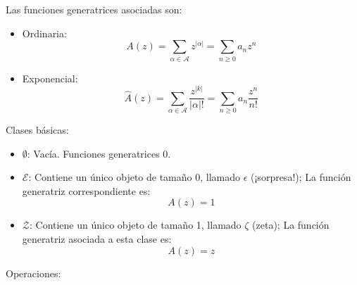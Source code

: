 \documentclass[english, spanish, fleqn, 10pt]{article}
\numberwithin{equation}{section}
\newcommand{\nparentesis}[1]{\left( #1 \right)}
\newcommand{\nabsoluto}[1]{\left| #1 \right|}
\theoremstyle{definition}
\begin{document}
Las funciones generatrices asociadas son:
\begin{itemize}
	\item Ordinaria:
	\begin{equation}
	A\nparentesis{z} = \sum_{\alpha \in \mathcal{A}} z^{\nabsoluto{\alpha}} = \sum_{n \geq 0}a_nz^n
	\end{equation}
	
	\item Exponencial:
	\begin{equation}
	\hat A \nparentesis{z} = \sum_{\alpha \in \mathcal{A}} \dfrac{z^{\nabsoluto{k}}}{\nabsoluto{\alpha}!} = \sum_{n \geq 0} a_n \dfrac{z^n}{n!}
	\end{equation}
\end{itemize}
Clases básicas:
\begin{itemize}
	\item $\emptyset$: Vacía. Funciones generatrices 0.
	
	\item $\mathcal{E}$: Contiene un único objeto de tamaño 0, llamado $\epsilon$ (¡sorpresa!); La función generatriz correspondiente es:
	\begin{equation*}
	A\nparentesis{z} = 1
	\end{equation*}
	
	\item $\mathcal{Z}$: Contiene un único objeto de tamaño 1, llamado $\zeta$ (zeta); La función generatriz asociada a esta clase es:
	\begin{equation*}
	A\nparentesis{z} = z
	\end{equation*}

\end{itemize}
Operaciones:
\end{document}
